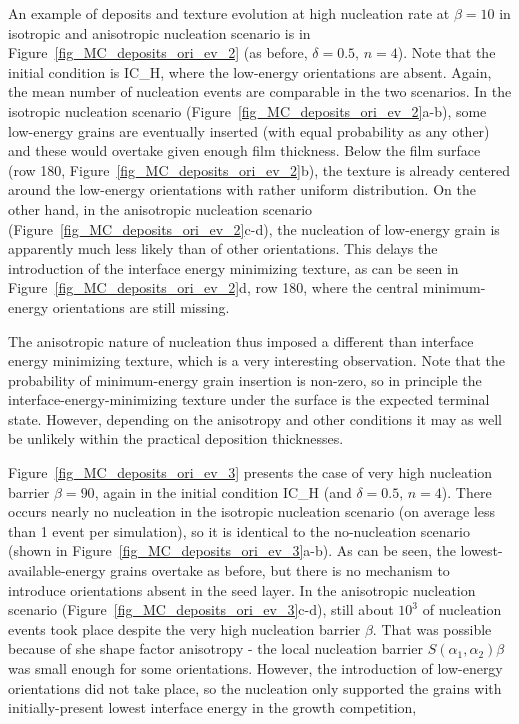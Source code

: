 An example of deposits and texture evolution at high nucleation rate at $\beta=10$ in isotropic and anisotropic nucleation scenario is in Figure~\ref{fig_MC_deposits_ori_ev_2} (as before, $\delta=0.5,\,n=4$). Note that the initial condition is IC\_H, where the low-energy orientations are absent. Again, the mean number of nucleation events are comparable in the two scenarios. In the isotropic nucleation scenario (Figure~\ref{fig_MC_deposits_ori_ev_2}a-b), some low-energy grains are eventually inserted (with equal probability as any other) and these would overtake given enough film thickness. Below the film surface (row 180, Figure~\ref{fig_MC_deposits_ori_ev_2}b), the texture is already centered around the low-energy orientations with rather uniform distribution. On the other hand, in the anisotropic nucleation scenario (Figure~\ref{fig_MC_deposits_ori_ev_2}c-d), the nucleation of low-energy grain is apparently much less likely than of other orientations. This delays the introduction of the interface energy minimizing texture, as can be seen in Figure~\ref{fig_MC_deposits_ori_ev_2}d, row 180, where the central minimum-energy orientations are still missing. 

The anisotropic nature of nucleation thus imposed a different than interface energy minimizing texture, which is a very interesting observation. Note that the probability of minimum-energy grain insertion is non-zero, so in principle the interface-energy-minimizing texture under the surface is the expected terminal state. However, depending on the anisotropy and other conditions it may as well be unlikely within the practical deposition thicknesses.

Figure~\ref{fig_MC_deposits_ori_ev_3} presents the case of very high nucleation barrier $\beta=90$, again in the initial condition IC\_H (and $\delta=0.5,\,n=4$). There occurs nearly no nucleation in the isotropic nucleation scenario (on average less than 1 event per simulation), so it is identical to the no-nucleation scenario (shown in Figure~\ref{fig_MC_deposits_ori_ev_3}a-b). As can be seen, the lowest-available-energy grains overtake as before, but there is no mechanism to introduce orientations absent in the seed layer. In the anisotropic nucleation scenario (Figure~\ref{fig_MC_deposits_ori_ev_3}c-d), still about $10^3$ of nucleation events took place despite the very high nucleation barrier $\beta$. That was possible because of she shape factor anisotropy - the local nucleation barrier $S(\alpha_1,\alpha_2)\beta$ was small enough for some orientations. However, the introduction of low-energy orientations did not take place, so the nucleation only supported the grains with initially-present lowest interface energy in the growth competition, 

